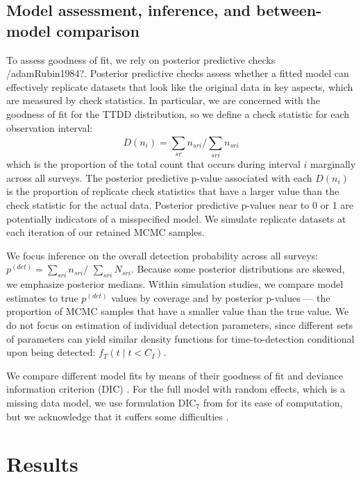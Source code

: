 \documentclass[useAMS,usenatbib,referee,12pt]{article}
\begin{document}
\subsection{Model assessment, inference, and between-model comparison}

To assess goodness of fit, we rely on posterior predictive checks \citep{Gelman1996}/adam{Rubin1984?}.  Posterior predictive checks assess whether a fitted model can effectively replicate datasets that look like the original data in key aspects, which are measured by check statistics.  In particular, we are concerned with the goodness of fit for the TTDD distribution, so we define a check statistic for each observation interval:
\[D(n_i) = \sum\limits_{sr} n_{sri} \big/ \sum\limits_{sri}^{} n_{sri}\]
which is the proportion of the total count that occurs during interval $i$ marginally across all surveys.  The posterior predictive p-value associated with each $D(n_i)$ is the proportion of replicate check statistics that have a larger value than the check statistic for the actual data.  Posterior predictive p-values near to 0 or 1 are potentially indicators of a misspecified model.  We simulate replicate datasets at each iteration of our retained MCMC samples.

We focus inference on the overall detection probability across all surveys: $p^{(det)} = \sum\limits_{sri}n_{sri}\big/$ $\sum\limits_{sri}N_{sri}$.  Because some posterior distributions are skewed, we emphasize posterior medians.  Within simulation studies, we compare model estimates to true $p^{(det)}$ values by coverage and by posterior p-values --- the proportion of MCMC samples that have a smaller value than the true value.  We do not focus on estimation of individual detection parameters, since different sets of parameters can yield similar density functions for time-to-detection conditional upon being detected: $f_T(t\;|\;t<C_I)$.

We compare different model fits by means of their goodness of fit and deviance information criterion (DIC) \citep{Spiegelhalter2002}.  For the full model with random effects, which is a missing data model, we use formulation DIC$_7$ from \citet{Celeux2006} for its ease of computation, but we acknowledge that it suffers some difficulties \citep{Celeux2006, Li2014}.




\section{Results}\label{sec:results}
\end{document}

